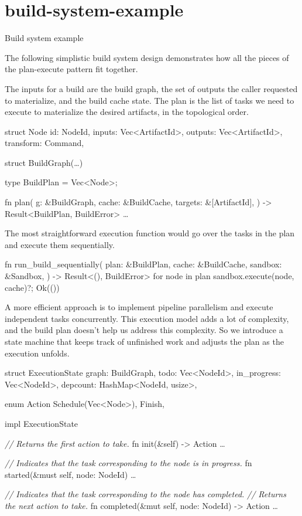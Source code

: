 \documentclass{article}
\begin{document}
\section{build-system-example}{Build system example}

The following simplistic build system design demonstrates how all the pieces of the plan-execute pattern fit together.

The inputs for a build are the build graph, the set of outputs the caller requested to materialize, and the build cache state.
The plan is the list of tasks we need to execute to materialize the desired artifacts, in the topological order.

\begin{code}[rust]
struct Node {
    id: NodeId,
    inputs: Vec<ArtifactId>,
    outputs: Vec<ArtifactId>,
    transform: Command,
}

struct BuildGraph(\ldots)

type BuildPlan = Vec<Node>;

fn plan(
    g: &BuildGraph,
    cache: &BuildCache,
    targets: &[ArtifactId],
) -> Result<BuildPlan, BuildError> { \ldots  }
\end{code}

The most straightforward execution function would go over the tasks in the plan and execute them sequentially.

\begin{code}[rust]
fn run_build_sequentially(
    plan: &BuildPlan,
    cache: &BuildCache,
    sandbox: &Sandbox,
) -> Result<(), BuildError> {
    for node in plan {
        sandbox.execute(node, cache)?;
    }
    Ok(())
}
\end{code}

A more efficient approach is to implement pipeline parallelism and execute independent tasks concurrently.
This execution model adds a lot of complexity, and the build plan doesn't help us address this complexity.
So we introduce a state machine that keeps track of unfinished work and adjusts the plan as the execution unfolds.

\begin{code}[rust]
struct ExecutionState {
    graph: BuildGraph,
    todo: Vec<NodeId>,
    in_progress: Vec<NodeId>,
    depcount: HashMap<NodeId, usize>,
}

enum Action {
    Schedule(Vec<Node>),
    Finish,
}

impl ExecutionState {
    \emph{// Returns the first action to take.}
    fn init(&self) -> Action { \ldots  }

    \emph{// Indicates that the task corresponding to the node is in progress.}
    fn started(&must self, node: NodeId) { \ldots  }

    \emph{// Indicates that the task corresponding to the node has completed.}
    \emph{// Returns the next action to take.}
    fn completed(&mut self, node: NodeId) -> Action { \ldots  }
}
\end{code}
\end{document}
